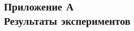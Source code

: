 \documentclass[a4paper,14pt]{article}
\begin{document}
    \newpage
    \renewcommand{\refname}{{\normalsize \hfill Список использованных источников \hfill}}
%    
    
    
    \newpage

    \begin{landscape}

        \begin{flushright}
            \section*{\normalsize \hfill Приложение А \\ \hfill Результаты экспериментов}
        \end{flushright}


\end{landscape}
\end{document}
